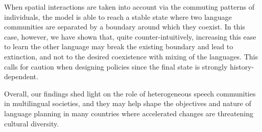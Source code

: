 \documentclass[../thesis.tex]{subfiles}
\begin{document}
When spatial interactions are taken into account via the commuting patterns of
individuals, the model is able to reach a stable state where two language communities
are separated by a boundary around which they coexist. In this case, however, we have
shown that, quite counter-intuitively, increasing this ease to learn the other language
may break the existing boundary and lead to extinction, and not to the desired
coexistence with mixing of the languages. This calls for caution when designing policies
since the final state is strongly history-dependent.

Overall, our findings shed light on the role of heterogeneous speech communities in
multilingual societies, and they may help shape the objectives and nature of language
planning \cite{KaplanLanguagePlanning1997} in many countries where accelerated changes
are threatening cultural diversity.
\end{document}
